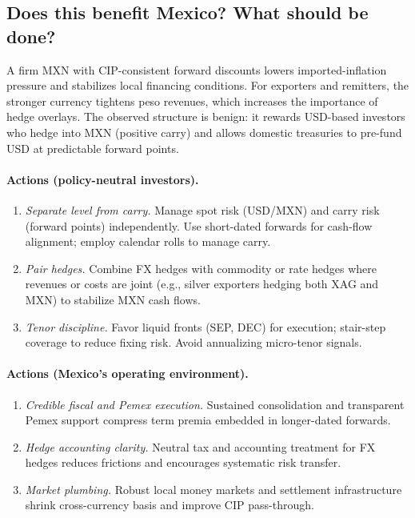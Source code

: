 \documentclass[11pt,a4paper]{article} %
\begin{document}
\subsection{Does this benefit Mexico? What should be done?}

A firm MXN with CIP-consistent forward discounts lowers imported-inflation pressure and stabilizes local financing conditions. For exporters and remitters, the stronger currency tightens peso revenues, which increases the importance of hedge overlays. The observed structure is benign: it rewards USD-based investors who hedge into MXN (positive carry) and allows domestic treasuries to pre-fund USD at predictable forward points.

\paragraph{Actions (policy-neutral investors).}
\begin{enumerate}
  \item \textit{Separate level from carry.} Manage spot risk (USD/MXN) and carry risk (forward points) independently. Use short-dated forwards for cash-flow alignment; employ calendar rolls to manage carry.
  \item \textit{Pair hedges.} Combine FX hedges with commodity or rate hedges where revenues or costs are joint (e.g., silver exporters hedging both XAG and MXN) to stabilize MXN cash flows.
  \item \textit{Tenor discipline.} Favor liquid fronts (SEP, DEC) for execution; stair-step coverage to reduce fixing risk. Avoid annualizing micro-tenor signals.
\end{enumerate}

\paragraph{Actions (Mexico's operating environment).}
\begin{enumerate}
  \item \textit{Credible fiscal and Pemex execution.} Sustained consolidation and transparent Pemex support compress term premia embedded in longer-dated forwards.
  \item \textit{Hedge accounting clarity.} Neutral tax and accounting treatment for FX hedges reduces frictions and encourages systematic risk transfer.
  \item \textit{Market plumbing.} Robust local money markets and settlement infrastructure shrink cross-currency basis and improve CIP pass-through.
\end{enumerate}
\end{document}

